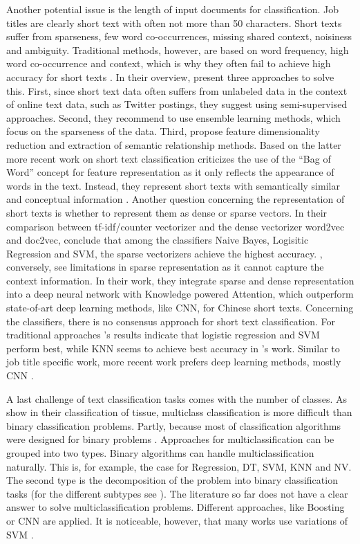 \documentclass[a4paper]{article}
\begin{document}
Another potential issue is the length of input documents for classification. Job titles are clearly short text with often not more than 50 characters. Short texts suffer from sparseness, few word co-occurrences, missing shared context, noisiness and ambiguity. Traditional methods, however, are based on word frequency, high word co-occurrence and context, which is why they often fail to achieve high accuracy for short texts \citep{Song2014, WangY2017, WangF2014}. In their overview, \cite{Song2014} present three approaches to solve this. First, since short text data often suffers from unlabeled data in the context of online text data, such as Twitter postings, they suggest using semi-supervised approaches. Second, they recommend to use ensemble learning methods, which focus on the sparseness of the data. Third, \cite{Song2014} propose feature dimensionality reduction and extraction of semantic relationship methods. Based on the latter more recent work on short text classification criticizes the use of the ``Bag of Word'' concept for feature representation as it only reflects the appearance of words in the text. Instead, they represent short texts with semantically similar and conceptual information \citep{Bouaziz2014, WangF2014, Chen2019}.
Another question concerning the representation of short texts is whether to represent them as dense or sparse vectors. In their comparison between tf-idf/counter vectorizer and the dense vectorizer word2vec and doc2vec, \cite{WangY2017} conclude that among the classifiers Naive Bayes, Logisitic Regression and SVM, the sparse vectorizers achieve the highest accuracy. \cite{Chen2019}, conversely, see limitations in sparse representation as it cannot capture the context information. In their work, they integrate sparse and dense representation into a deep neural network with Knowledge powered Attention, which outperform state-of-art deep learning methods, like CNN, for Chinese short texts. 
Concerning the classifiers, there is no consensus approach for short text classification. For traditional approaches \cite{WangY2017}'s results indicate that logistic regression and SVM perform best, while KNN seems to achieve best accuracy in \cite{Khamar2013}'s work. Similar to job title specific work, more recent work prefers deep learning methods, mostly CNN \citep{Chen2019}. 

A last challenge of text classification tasks comes with the number of classes. As \cite{Li2004} show in their classification of tissue, multiclass classification is more difficult than binary classification problems. Partly, because most of classification algorithms were designed for binary problems \citep{Aly2005}. Approaches for multiclassification can be grouped into two types. Binary algorithms can handle multiclassification naturally. This is, for example, the case for Regression, DT, SVM, KNN and NV. The second type is the decomposition of the problem into binary classification tasks (for the different subtypes see \cite{Aly2005}). The literature so far does not have a clear answer to solve multiclassification problems. Different approaches, like Boosting \citep{Schapire2000} or CNN \citep{Farooq2017} are applied. It is noticeable, however, that many works use variations of SVM \citep{Guo2015,Tomar2015,Tang2019}. 
\end{document}
